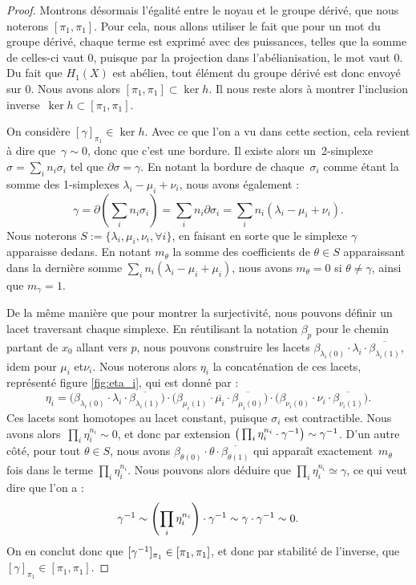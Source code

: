 \begin{proof}
\bigskip Montrons désormais l'égalité entre le noyau et le groupe dérivé, que nous noterons $[\pi_1,\pi_1]$. Pour cela, nous allons utiliser le fait que pour un mot du groupe dérivé, chaque terme est exprimé avec des puissances, telles que la somme de celles-ci vaut 0, puisque par la projection dans l'abélianisation, le mot vaut 0. Du fait que $H_1(X)$ est abélien, tout élément du groupe dérivé est donc envoyé sur 0. Nous avons alors $[\pi_1,\pi_1]\subset \ker h$. Il nous reste alors à montrer l'inclusion inverse~$\ker h\subset [\pi_1,\pi_1]$.

On considère $[\gamma]_{\pi_1}\in\ker h$. Avec ce que l'on a vu dans cette section, cela revient à dire que~$\gamma\sim 0$, donc que c'est une bordure. Il existe alors un~2-simplexe~$\sigma=\sum_in_i\sigma_i$ tel que $\partial\sigma=\gamma$. En notant la bordure de chaque~$\sigma_i$ comme étant la somme des 1-simplexes $\lambda_i-\mu_i+\nu_i$, nous avons également : \[\gamma=\partial\left(\sum_in_i\sigma_i\right)=\sum_in_i\partial\sigma_i=\sum_in_i(\lambda_i-\mu_i+\nu_i).\]Nous noterons $S:=\{\lambda_i,\mu_i,\nu_i,\forall i\}$, en faisant en sorte que le simplexe $\gamma$ apparaisse dedans. En notant $m_\theta$ la somme des coefficients de $\theta\in S$ apparaissant dans la dernière somme $\sum_in_i(\lambda_i-\mu_i+\mu_i)$, nous avons $m_\theta=0$ si $\theta\neq\gamma$, ainsi que $m_\gamma=1$.

De la même manière que pour montrer la surjectivité, nous pouvons définir un lacet traversant chaque simplexe. En réutilisant la notation $\beta_p$ pour le chemin partant de $x_0$ allant vers $p$, nous pouvons construire les lacets $\beta_{\lambda_i(0)}\cdot\lambda_i\cdot\overline{\beta_{\lambda_i(1)}}$, idem pour $\mu_i$ et$\nu_i$. Nous noterons alors $\eta_i$ la concaténation de ces lacets, représenté figure \ref{fig:eta_i}, qui est donné par : \[\eta_i=\big(\beta_{\lambda_i(0)}\cdot\lambda_i\cdot\overline{\beta_{\lambda_i(1)}}\big)\cdot\big(\beta_{\mu_i(1)}\cdot\overline{\mu_i}\cdot\overline{\beta_{\mu_i(0)}}\big)\cdot\big(\beta_{\nu_i(0)}\cdot\nu_i\cdot\overline{\beta_{\nu_i(1)}}\big).\] Ces lacets sont homotopes au lacet constant, puisque $\sigma_i$ est contractible. Nous avons alors~${\prod_i\eta_i^{n_i}\sim0}$, et donc par extension $\big(\prod_i\eta_i^{n_i}\cdot\gamma^{-1}\big)\sim\gamma^{-1}$. D'un autre côté, pour tout $\theta\in S$, nous avons $\beta_{\theta(0)}\cdot\theta\cdot\overline{\beta_{\theta(1)}}$ qui apparaît exactement~$m_\theta$ fois dans le terme $\prod_i\eta_i^{n_i}$. Nous pouvons alors déduire que ${\prod_i\eta_i^{n_i}\simeq\gamma}$, ce qui veut dire que l'on a : \[\gamma^{-1}\sim\left(\prod_i\eta_i^{n_i}\right)\cdot\gamma^{-1}\sim\gamma\cdot\gamma^{-1}\sim 0.\]On en conclut donc que $[\gamma^{-1}]_{\pi_1}\in[\pi_1,\pi_1]$, et donc par stabilité de l'inverse, que~$[\gamma]_{\pi_1}\in[\pi_1,\pi_1]$.
\end{proof}

